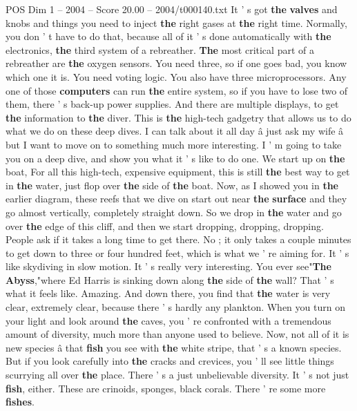 \begin{textsample}{POS Dim 1 – 2004 – Score 20.00 – 2004/t000140.txt}
It ' s got \textbf{the} \textbf{valves} and knobs and things you need to inject \textbf{the} right gases at \textbf{the} right time.
Normally, you don ' t have to do that, because all of it ' s done automatically with \textbf{the} electronics, \textbf{the} third system of a rebreather. \textbf{The} most critical part of a rebreather are \textbf{the} oxygen sensors.
You need three, so if one goes bad, you know which one it is.
You need voting logic.
You also have three microprocessors.
Any one of those \textbf{computers} can run \textbf{the} entire system, so if you have to lose two of them, there ' s back-up power supplies.
And there are multiple displays, to get \textbf{the} information to \textbf{the} diver.
This is \textbf{the} high-tech gadgetry that allows us to do what we do on these deep dives.
I can talk about it all day â just ask my wife â but I want to move on to something much more interesting.
I ' m going to take you on a deep dive, and show you what it ' s like to do one.
We start up on \textbf{the} boat, For all this high-tech, expensive equipment, this is still \textbf{the} best way to get in \textbf{the} water, just flop over \textbf{the} side of \textbf{the} boat.
Now, as I showed you in \textbf{the} earlier diagram, these reefs that we dive on start out near \textbf{the} \textbf{surface} and they go almost vertically, completely straight down.
So we drop in \textbf{the} water and go over \textbf{the} edge of this cliff, and then we start dropping, dropping, dropping.
People ask if it takes a long time to get there.
No ; it only takes a couple minutes to get down to three or four hundred feet, which is what we ' re aiming for.
It ' s like skydiving in slow motion.
It ' s really very interesting.
You ever see"\textbf{The} \textbf{Abyss},"where Ed Harris is sinking down along \textbf{the} side of \textbf{the} wall?
That ' s what it feels like.
Amazing.
And down there, you find that \textbf{the} water is very clear, extremely clear, because there ' s hardly any plankton.
When you turn on your light and look around \textbf{the} caves, you ' re confronted with a tremendous amount of diversity, much more than anyone used to believe.
Now, not all of it is new species â that \textbf{fish} you see with \textbf{the} white stripe, that ' s a known species.
But if you look carefully into \textbf{the} cracks and crevices, you ' ll see little things scurrying all over \textbf{the} place.
There ' s a just unbelievable diversity.
It ' s not just \textbf{fish}, either.
These are crinoids, sponges, black corals.
There ' re some more \textbf{fishes}.

\end{textsample}
